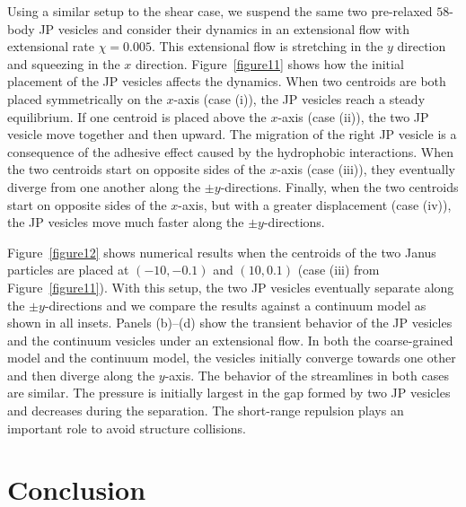 \documentclass[lineno]{jfm}
\begin{document}
Using a similar setup to the shear case, we suspend the same two
pre-relaxed $58$-body JP vesicles and consider their dynamics in an
extensional flow with extensional rate $\chi=0.005$. This extensional
flow is stretching in the $y$ direction and squeezing in the $x$
direction. Figure~\ref{figure11} shows how the initial placement of the
JP vesicles affects the dynamics. When two centroids are both placed
symmetrically on the $x$-axis (case (i)), the JP vesicles reach a steady
equilibrium. If one centroid is placed above the $x$-axis (case (ii)),
the two JP vesicle move together and then upward. The migration of the
right JP vesicle is a consequence of the adhesive effect caused by the
hydrophobic interactions. When the two centroids start on opposite sides
of the $x$-axis (case (iii)), they eventually diverge from one another
along the $\pm y$-directions. Finally, when the two centroids start on
opposite sides of the $x$-axis, but with a greater displacement (case
(iv)), the JP vesicles move much faster along the $\pm y$-directions.

Figure~\ref{figure12} shows numerical results when the centroids of the
two Janus particles are placed at $(-10,-0.1)$ and $(10,0.1)$ (case
(iii) from Figure~\ref{figure11}). With this setup, the two JP vesicles
eventually separate along the $\pm y$-directions and we compare the
results against a continuum model as shown in all insets. Panels
(b)--(d) show the transient behavior of the JP vesicles and the
continuum vesicles under an extensional flow. In both the coarse-grained
model and the continuum model, the vesicles initially converge towards
one other and then diverge along the $y$-axis. The behavior of the
streamlines in both cases are similar. The pressure is initially largest
in the gap formed by two JP vesicles and decreases during the
separation. The short-range repulsion plays an important role to avoid
structure collisions.




\section{\label{conclusion}Conclusion}
\end{document}
